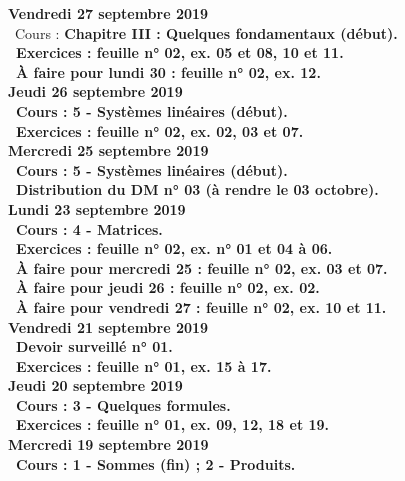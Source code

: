 \documentclass[12pt,a4paper]{article}
\begin{document}
 \noindent\textbf{Vendredi 27 septembre 2019}\\
 \bu\ Cours : \bf Chapitre III \rm : Quelques fondamentaux (début).\\
 \bu\ Exercices : feuille n° 02, ex. 05 et 08, 10 et 11.\\
 \bu\ À faire pour lundi 30 : feuille n° 02, ex. 12.\vspace{.4cm}\\
 
 \noindent\textbf{Jeudi 26 septembre 2019}\\
 \bu\ Cours : 5 - Systèmes linéaires (début).\\
 \bu\ Exercices : feuille n° 02, ex. 02, 03 et 07.\vspace{.4cm}\\
 
 \noindent\textbf{\bf Mercredi 25 septembre 2019}\\
 \bu\ Cours : 5 - Systèmes linéaires (début).\\
 \bu\ Distribution du DM n° 03 (à rendre le 03 octobre).\\
 
 \noindent\textbf{\bf Lundi 23 septembre 2019}\\
 \bu\ Cours : 4 - Matrices.\\
 \bu\ Exercices : feuille n° 02, ex. n° 01 et 04 à 06.\\
 \bu\ À faire pour mercredi 25 : feuille n° 02, ex. 03 et 07.\\
 \bu\ À faire pour jeudi 26 : feuille n° 02, ex. 02.\\
 \bu\ À faire pour vendredi 27 : feuille n° 02, ex. 10 et 11.\vspace{.4cm}\\ 
 
 \noindent\textbf{Vendredi 21 septembre 2019}\\
 \bu\ Devoir surveillé n° 01.\\
 \bu\ Exercices : feuille n° 01, ex. 15 à 17.\vspace{.4cm}\\
  
 \noindent\textbf{Jeudi 20 septembre 2019}\\
 \bu\ Cours : 3 - Quelques formules.\\
 \bu\ Exercices : feuille n° 01, ex. 09, 12, 18 et 19.\vspace{.4cm}\\
 
 \noindent\textbf{\bf Mercredi 19 septembre 2019}\\
 \bu\ Cours : 1 - Sommes (fin) ; 2 - Produits.\vspace{.4cm}\\
 
\end{document}
